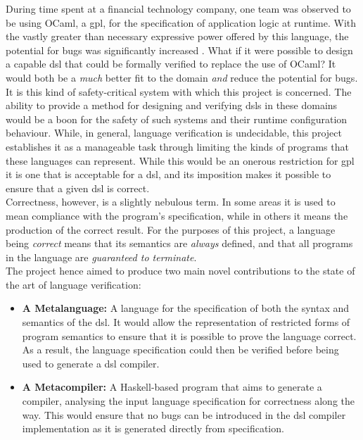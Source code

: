 During time spent at a financial technology company, one team was observed to be using OCaml, a \gls{gpl}, for the specification of application logic at runtime. 
With the vastly greater than necessary expressive power offered by this language, the potential for bugs was significantly increased \citep{subramanyam2003empirical}.
What if it were possible to design a capable \gls{dsl} that could be formally verified to replace the use of OCaml?
It would both be a \textit{much} better fit to the domain \textit{and} reduce the potential for bugs.\\

It is this kind of safety-critical system with which this project is concerned.
The ability to provide a method for designing and verifying \glspl{dsl} in these domains would be a boon for the safety of such systems and their runtime configuration behaviour.
While, in general, language verification is \gls{undecidable}, this project establishes it as a manageable task through limiting the kinds of programs that these languages can represent.
While this would be an onerous restriction for \gls{gpl} it is one that is acceptable for a \gls{dsl}, and its imposition makes it possible to ensure that a given \gls{dsl} is correct.\\

Correctness, however, is a slightly nebulous term. 
In some areas it is used to mean compliance with the program's specification, while in others it means the production of the correct result.
For the purposes of this project, a language being \textit{correct} means that its semantics are \textit{always} defined, and that all programs in the language are \textit{guaranteed to terminate}. \\

The project hence aimed to produce two main novel contributions to the state of the art of language verification:
\begin{itemize}
    \item \textbf{A Metalanguage:} A language for the specification of both the \gls{syntax} and \gls{semantics} of the \gls{dsl}. 
    It would allow the representation of restricted forms of program semantics to ensure that it is possible to prove the language correct.
    As a result, the language specification could then be verified before being used to generate a \gls{dsl} compiler. 
    \item \textbf{A Metacompiler:} A Haskell-based program that aims to generate a compiler, analysing the input language specification for correctness along the way.
    This would ensure that no bugs can be introduced in the \gls{dsl} compiler implementation as it is generated directly from specification.
\end{itemize}

